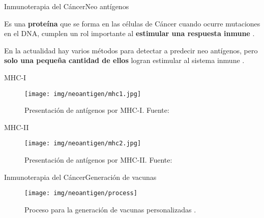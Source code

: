 \documentclass[10pt]{beamer}
\newcommand{\1}{
	\setbeamertemplate{background}{
		\texttt{[image: img/1]}
		\tikz[overlay] \fill[fill opacity=0.75,fill=white] (0,0) rectangle (-\paperwidth,\paperheight);
	}
}
\begin{document}
\begin{frame}{Inmunoterapia del Cáncer}{Neo antígenos}		
	\begin{block}{}
		Es una \textbf{proteína} que se forma en las células de Cáncer cuando ocurre mutaciones en el DNA, cumplen un rol importante al \textbf{estimular una respuesta inmune} \cite{NCIdictionary2022, borden2022cancer}.
	\end{block} 
	\begin{block}{}
		En la actualidad hay varios métodos para detectar a predecir neo antígenos, pero \textbf{solo una pequeña cantidad de ellos} logran estimular al sistema inmune \cite{chen2021challenges, hao2021improvement}.
	\end{block}
\end{frame}

\begin{frame}{MHC-I}{}		
	\begin{figure}[H]
		\centering
		\texttt{[image: img/neoantigen/mhc1.jpg]}
		\caption{Presentación de antígenos por MHC-I. Fuente: \cite{zhang2019application}}
		\label{fig:mhc1}
	\end{figure}	
\end{frame}

\begin{frame}{MHC-II}{}		
	\begin{figure}[H]
		\centering
		\texttt{[image: img/neoantigen/mhc2.jpg]}
		\caption{Presentación de antígenos por MHC-II. Fuente: \cite{zhang2019application}}
		\label{fig:mhc2}
	\end{figure}	
\end{frame}

\begin{frame}{Inmunoterapia del Cáncer}{Generación de vacunas}	
	\begin{figure}
		\texttt{[image: img/neoantigen/process]}
		\caption{Proceso para la generación de vacunas personalizadas \cite{peng2019neoantigen}.}
	\end{figure}		
\end{frame}
\end{document}
